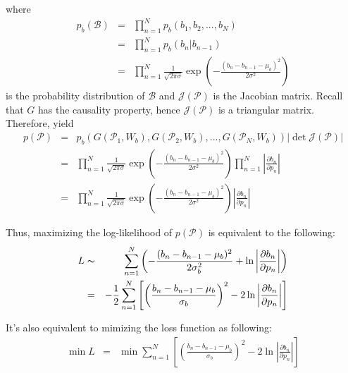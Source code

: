 \documentclass[11pt]{article}
\begin{document}
where
\begin{eqnarray}
p_b({\mathcal{B}}) &=& \prod_{n=1}^{N} p_b(b_1, b_2, ..., b_N) \\
                   &=& \prod_{n=1}^{N} p_b(b_n|b_{n-1}) \\
                   &=& \prod_{n=1}^{N} \frac{1}{\sqrt{2 \pi \sigma}} \exp\left(-\frac{(b_{n}-b_{n-1}-\mu_{b})^2}{2 \sigma^2}\right)
\end{eqnarray}
is the probability distribution of \(\mathcal{B}\) and \(\mathcal{J(P)}\) is the Jacobian matrix. Recall that \(G\) has the
causality property, hence \(\mathcal{J(P)}\) is a triangular matrix. Therefore, yield
\begin{eqnarray}
p(\mathcal{P}) &=& p_b(G(\mathcal{P}_1, W_b), G(\mathcal{P}_2, W_b), ..., G(\mathcal{P}_N, W_b)) \left|\det \mathcal{J(P)}\right| \\
               &=& \prod_{n=1}^{N} \frac{1}{\sqrt{2 \pi \sigma}} \exp\left(-\frac{(b_{n}-b_{n-1}-\mu_{b})^2}{2 \sigma^2}\right)
                   \prod_{n=1}^{N} \left| \frac{\partial b_n}{\partial p_n} \right| \\
               &=& \prod_{n=1}^{N} \frac{1}{\sqrt{2 \pi \sigma}} \exp\left(-\frac{(b_{n}-b_{n-1}-\mu_{b})^2}{2 \sigma^2}\right) \left|\frac{\partial b_n}{\partial p_n}\right|
\end{eqnarray}

Thus, maximizing the log-likelihood of \(p(\mathcal{P})\) is equivalent to the following:
\begin{eqnarray}
L &\thicksim& \sum_{n=1}^{N} \left(- \frac{(b_n-b_{n-1}-\mu_{b})^2}{2 \sigma_{b}^2} + \ln \left|\frac{\partial b_n}{\partial p_n}\right|\right) \\
  &=& - \frac{1}{2} \sum_{n=1}^{N} \left[\left(\frac{b_n - b_{n-1} - \mu_{b}}{\sigma_b} \right)^2 - 2 \ln \left|\frac{\partial b_n}{\partial p_n}\right|\right]
\end{eqnarray}

It's also equivalent to mimizing the loss function as following:
\begin{eqnarray}
\min L &=& \min \sum_{n=1}^{N} \left[\left(\frac{b_n - b_{n-1} - \mu_{b}}{\sigma_b} \right)^2 - 2 \ln \left|\frac{\partial b_n}{\partial p_n}\right|\right]
\end{eqnarray}
\end{document}
